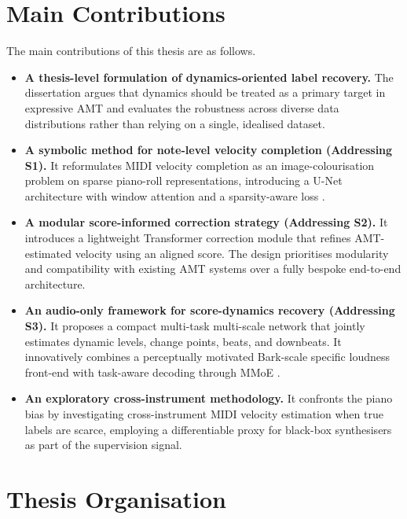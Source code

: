 \section{Main Contributions}
\label{sec:intro:contrib}

The main contributions of this thesis are as follows.

\begin{itemize}
    \item \textbf{A thesis-level formulation of dynamics-oriented label recovery.} The dissertation argues that dynamics should be treated as a primary target in expressive AMT and evaluates the robustness across diverse data distributions rather than relying on a single, idealised dataset.
    
    \item \textbf{A symbolic method for note-level velocity completion (Addressing S1).} It reformulates MIDI velocity completion as an image-colourisation problem on sparse piano-roll representations, introducing a U-Net architecture with window attention and a sparsity-aware loss \cite{he2025filling}.

    \item \textbf{A modular score-informed correction strategy (Addressing S2).} It introduces a lightweight Transformer correction module that refines AMT-estimated velocity using an aligned score. The design prioritises modularity and compatibility with existing AMT systems over a fully bespoke end-to-end architecture.

    \item \textbf{An audio-only framework for score-dynamics recovery (Addressing S3).} It proposes a compact multi-task multi-scale network that jointly estimates dynamic levels, change points, beats, and downbeats. It innovatively combines a perceptually motivated Bark-scale specific loudness front-end with task-aware decoding through MMoE \cite{he2026dynest,ma2018mmoe}.
  
    \item \textbf{An exploratory cross-instrument methodology.} It confronts the piano bias by investigating cross-instrument MIDI velocity estimation when true labels are scarce, employing a differentiable proxy for black-box synthesisers as part of the supervision signal.
\end{itemize}


\section{Thesis Organisation}
\label{sec:intro:organisation}

